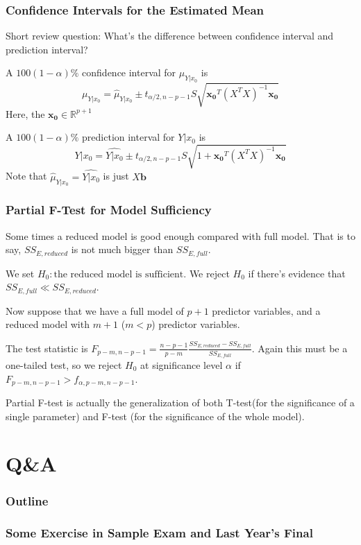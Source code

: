 \documentclass{beamer}
\begin{document}
\begin{frame}
    \frametitle{Confidence Intervals for the Estimated Mean}

    Short review question: What's the difference between confidence interval and prediction interval?\par
    \vspace{0.3cm}

    A $100(1-\alpha)\%$ confidence interval for $\mu_{Y|x_0}$ is 
    \[\mu_{Y|x_0}=\hat{\mu}_{Y|x_0}\pm t_{\alpha/2, n-p-1} S \sqrt{\mathbf{x_0}^{T}(X^{T}X)^{-1}\mathbf{x_0}}\]
    Here, the $\mathbf{x_0}\in \mathbb{R}^{p+1}$\par

    A $100(1-\alpha)\%$ prediction interval for $Y|x_0$ is 
    \[Y|x_0=\widehat{Y|x_0}\pm t_{\alpha/2, n-p-1} S \sqrt{1+\mathbf{x_0}^{T}(X^{T}X)^{-1}\mathbf{x_0}}\]
    Note that $\hat{\mu}_{Y|x_0}=\widehat{Y|x_0}$ is just $X\mathbf{b}$

\end{frame}

\begin{frame}
\frametitle{Partial F-Test for Model Sufficiency}

    Some times a reduced model is good enough compared with full model. That is to say, $SS_{E,reduced}$ is not much bigger than $SS_{E, full}$.\par
    We set $H_0: \text{the reduced model is sufficient}$. We reject $H_0$ if there's evidence that $SS_{E,full}\ll SS_{E,reduced}$.\par
    \vspace{0.3cm}
    Now suppose that we have a full model of $p+1$ predictor variables, and a reduced model with $m+1$ ($m<p$) predictor variables.\par
    \vspace{0.3cm}
    The test statistic is $F_{p-m,n-p-1}=\frac{n-p-1}{p-m}\frac{SS_{E,reduced}-SS_{E,full}}{SS_{E,full}}$. Again this must be a one-tailed test, so we reject $H_0$ at significance level $\alpha$ if $F_{p-m,n-p-1}>f_{\alpha,p-m,n-p-1}$.\par
    \vspace{0.3cm}
    Partial F-test is actually the generalization of both T-test(for the significance of a single parameter) and F-test (for the significance of the whole model).

\end{frame}

\section{Q\&A}
\begin{frame}
    \frametitle{Outline}
    \tableofcontents[currentsection]
\end{frame}
\begin{frame}
    \frametitle{Some Exercise in Sample Exam and Last Year's Final}

    

\end{frame}
\end{document}
